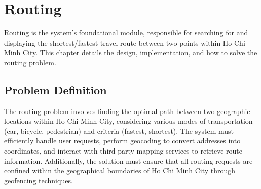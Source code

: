 \chapter{Routing}
\label{chap:routing}
Routing is the system’s foundational module, responsible for searching for and displaying the shortest/fastest travel route between two points within Ho Chi Minh City. This chapter details the design, implementation, and how to solve the routing problem.


\section{Problem Definition}
The routing problem involves finding the optimal path between two geographic locations within Ho Chi Minh City, considering various modes of transportation (car, bicycle, pedestrian) and criteria (fastest, shortest). 
The system must efficiently handle user requests, perform geocoding to convert addresses into coordinates, and interact with third-party mapping services to retrieve route information. Additionally, the solution must ensure that all routing requests are confined within the geographical boundaries of Ho Chi Minh City through geofencing techniques.

